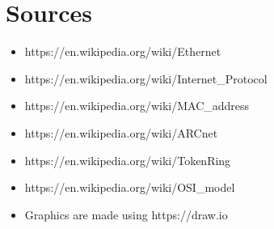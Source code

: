 \documentclass{article}
\begin{document}
	\newpage

\section{Sources}
	\begin{itemize}
		\itemsep0em
		\item https://en.wikipedia.org/wiki/Ethernet
		\item https://en.wikipedia.org/wiki/Internet\_Protocol
		\item https://en.wikipedia.org/wiki/MAC\_address
		\item https://en.wikipedia.org/wiki/ARCnet
		\item https://en.wikipedia.org/wiki/TokenRing
		\item https://en.wikipedia.org/wiki/OSI\_model
		\item Graphics are made using https://draw.io
	\end{itemize}
	
\end{document}
